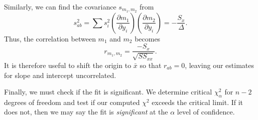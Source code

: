Similarly, we can find the covariance $s_{m_1,m_2}$ from
\begin{equation}
s^2_{ab} = \sum s ^2_i \left( \frac{\partial m_1}{\partial y_i} \right)
\left( \frac{\partial m_2}{\partial y_i}\right) = -\frac{S_x}{\Delta}.
\end{equation}
Thus, the correlation between $m_1$ and $m_2$ becomes
\begin{equation}
r_{m_1,m_2} = \frac{-S_x}{\sqrt{SS_{xx}}}.
\label{eq:uncorrelated_a_b}
\end{equation}
It is therefore useful to shift the origin to $\bar{x}$ so that $r_{ab} = 0$, leaving our estimates for slope and intercept uncorrelated.  

	Finally, we must check if the fit is significant.  We determine 
critical $\chi ^2_\alpha$ for $n - 2$ degrees of freedom and test if our computed $\chi^2$ exceeds the critical limit.  If it 
does not, then we may say the fit is \emph{significant} at the $\alpha$ level of confidence.

